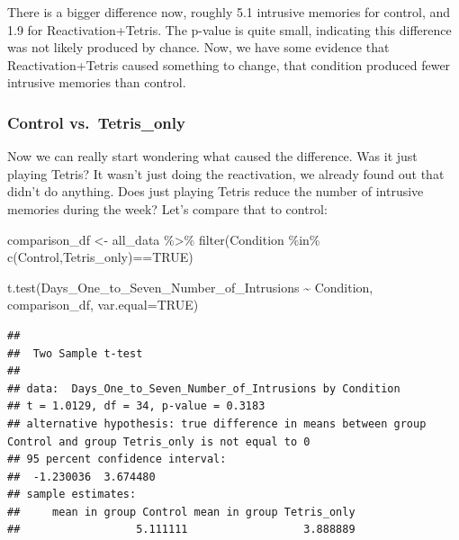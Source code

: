 \documentclass[
]{book}
\newenvironment{Shaded}{\begin{snugshade}}{\end{snugshade}}
\newcommand{\AttributeTok}[1]{\textcolor[rgb]{0.77,0.63,0.00}{#1}}
\newcommand{\ConstantTok}[1]{\textcolor[rgb]{0.00,0.00,0.00}{#1}}
\newcommand{\FunctionTok}[1]{\textcolor[rgb]{0.00,0.00,0.00}{#1}}
\newcommand{\NormalTok}[1]{#1}
\newcommand{\OtherTok}[1]{\textcolor[rgb]{0.56,0.35,0.01}{#1}}
\newcommand{\SpecialCharTok}[1]{\textcolor[rgb]{0.00,0.00,0.00}{#1}}
\newcommand{\StringTok}[1]{\textcolor[rgb]{0.31,0.60,0.02}{#1}}
\begin{document}
There is a bigger difference now, roughly 5.1 intrusive memories for control, and 1.9 for Reactivation+Tetris. The p-value is quite small, indicating this difference was not likely produced by chance. Now, we have some evidence that Reactivation+Tetris caused something to change, that condition produced fewer intrusive memories than control.

\hypertarget{control-vs.-tetris_only}{%
\subsubsection{Control vs.~Tetris\_only}\label{control-vs.-tetris_only}}

Now we can really start wondering what caused the difference. Was it just playing Tetris? It wasn't just doing the reactivation, we already found out that didn't do anything. Does just playing Tetris reduce the number of intrusive memories during the week? Let's compare that to control:

\begin{Shaded}
\begin{Highlighting}[]
\NormalTok{comparison\_df }\OtherTok{\textless{}{-}}\NormalTok{ all\_data }\SpecialCharTok{\%\textgreater{}\%} 
                  \FunctionTok{filter}\NormalTok{(Condition }\SpecialCharTok{\%in\%} \FunctionTok{c}\NormalTok{(}\StringTok{\textquotesingle{}Control\textquotesingle{}}\NormalTok{,}\StringTok{\textquotesingle{}Tetris\_only\textquotesingle{}}\NormalTok{)}\SpecialCharTok{==}\ConstantTok{TRUE}\NormalTok{)}
                        
\FunctionTok{t.test}\NormalTok{(Days\_One\_to\_Seven\_Number\_of\_Intrusions }\SpecialCharTok{\textasciitilde{}}\NormalTok{ Condition, }
\NormalTok{       comparison\_df,}
       \AttributeTok{var.equal=}\ConstantTok{TRUE}\NormalTok{)}
\end{Highlighting}
\end{Shaded}

\begin{verbatim}
## 
##  Two Sample t-test
## 
## data:  Days_One_to_Seven_Number_of_Intrusions by Condition
## t = 1.0129, df = 34, p-value = 0.3183
## alternative hypothesis: true difference in means between group Control and group Tetris_only is not equal to 0
## 95 percent confidence interval:
##  -1.230036  3.674480
## sample estimates:
##     mean in group Control mean in group Tetris_only 
##                  5.111111                  3.888889
\end{verbatim}
\end{document}
